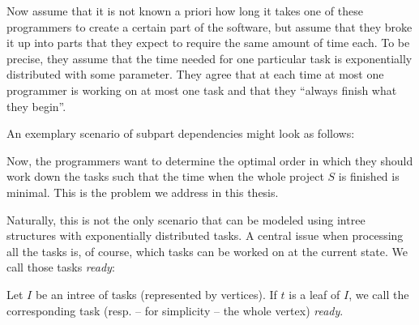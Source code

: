 Now assume that it is not known a priori how long it takes one of these programmers to create a certain part of the software, but assume that they broke it up into parts that they expect to require the same amount of time each. To be precise, they assume that the time needed for one particular task is exponentially distributed with some parameter. They agree that at each time at most one programmer is working on at most one task and that they ``always finish what they begin''.

An exemplary scenario of subpart dependencies might look as follows:

\begin{center}
\end{center}

Now, the programmers want to determine the optimal order in which they should work down the tasks such that the time when the whole project $S$ is finished is minimal. This is the problem we address in this thesis.

Naturally, this is not the only scenario that can be modeled using intree structures with exponentially distributed tasks. A central issue when processing all the tasks is, of course, which tasks can be worked on at the current state. We call those tasks \emph{ready}:

\begin{definition}
  Let $I$ be an intree of tasks (represented by vertices). If $t$ is a leaf of $I$, we call the corresponding task (resp. -- for simplicity -- the whole vertex) \emph{ready}.
\end{definition}

